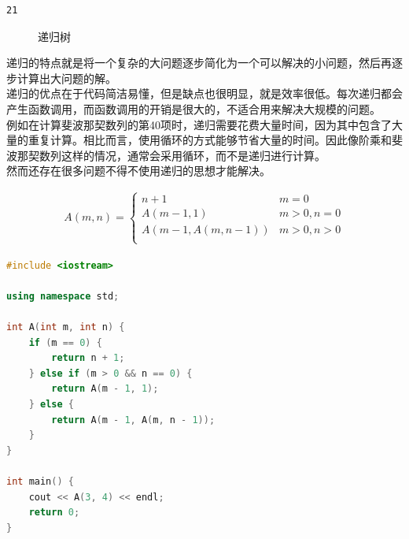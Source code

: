 \begin{tcolorbox}
	\begin{verbatim}
21
	\end{verbatim}
\end{tcolorbox}

\begin{figure}[H]
	\centering
	\caption{递归树}
\end{figure}

递归的特点就是将一个复杂的大问题逐步简化为一个可以解决的小问题，然后再逐步计算出大问题的解。\\

递归的优点在于代码简洁易懂，但是缺点也很明显，就是效率很低。每次递归都会产生函数调用，而函数调用的开销是很大的，不适合用来解决大规模的问题。\\

例如在计算斐波那契数列的第40项时，递归需要花费大量时间，因为其中包含了大量的重复计算。相比而言，使用循环的方式能够节省大量的时间。因此像阶乘和斐波那契数列这样的情况，通常会采用循环，而不是递归进行计算。\\

然而还存在很多问题不得不使用递归的思想才能解决。\\


\begin{align}\nonumber
	A(m, n) =
	\begin{cases}
		n + 1             & m = 0        \\
		A(m-1, 1)         & m > 0, n = 0 \\
		A(m-1, A(m, n-1)) & m > 0, n > 0 \\
	\end{cases}
\end{align}

\begin{lstlisting}[language=C++]
#include <iostream>

using namespace std;

int A(int m, int n) {
	if (m == 0) {
		return n + 1;
	} else if (m > 0 && n == 0) {
		return A(m - 1, 1);
	} else {
		return A(m - 1, A(m, n - 1));
	}
}

int main() {
	cout << A(3, 4) << endl;
	return 0;
}
\end{lstlisting}

